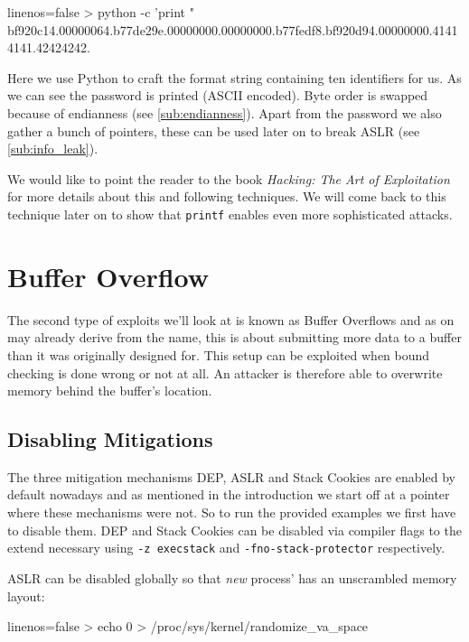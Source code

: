 \documentclass[article]{uibk}
\begin{document}
\begin{code*}{linenos=false}
    > python -c 'print "%
    bf920c14.00000064.b77de29e.00000000.00000000.b77fedf8.bf920d94.00000000.41414141.42424242.
\end{code*}

Here we use Python to craft the format string containing ten identifiers for
us. As we can see the password is printed (ASCII encoded). Byte order is
swapped because of endianness (see \cref{sub:endianness}). Apart from the
password we also gather a bunch of pointers, these can be used later on to
break ASLR (see \cref{sub:info_leak}).

We would like to point the reader to the book \textit{Hacking: The Art of
Exploitation}~\cite[pp.~167]{art_of_exploitation} for more details about this
and following techniques. We will come back to this technique later on to show
that \texttt{printf} enables even more sophisticated attacks.

\section{Buffer Overflow}
\label{sec:buffer_overflow}

The second type of exploits we'll look at is known as Buffer Overflows and as
on may already derive from the name, this is about submitting more data to a
buffer than it was originally designed for. This setup can be exploited when
bound checking is done wrong or not at all. An attacker is therefore able to
overwrite memory behind the buffer's location.

\subsection{Disabling Mitigations}

The three mitigation mechanisms DEP, ASLR and Stack Cookies are enabled by
default nowadays and as mentioned in the introduction we start off at a pointer
where these mechanisms were not. So to run the provided examples we first have
to disable them. DEP and Stack Cookies can be disabled via compiler flags to
the extend necessary using \texttt{-z execstack} and
\texttt{-fno-stack-protector} respectively.

ASLR can be disabled globally so that \emph{new} process' has an unscrambled
memory layout:

\begin{code*}{linenos=false}
    > echo 0 > /proc/sys/kernel/randomize_va_space
\end{code*}
\end{document}

